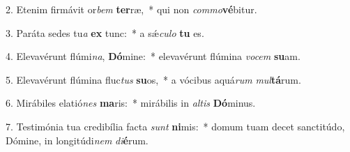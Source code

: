 2. Etenim firmávit or\textit{bem} \textbf{ter}ræ,~*  qui non \textit{com}\textit{mo}\textbf{vé}bitur.\

3. Paráta sedes tu\textit{a} \textbf{ex} tunc:~*  a sǽ\textit{cu}\textit{lo} \textbf{tu} es.\

4. Elevavérunt flúmi\textit{na}, \textbf{Dó}mine:~*  elevavérunt flúmina \textit{vo}\textit{cem} \textbf{su}am.\

5. Elevavérunt flúmina fluc\textit{tus} \textbf{su}os,~*  a vócibus aquá\textit{rum} \textit{mul}\textbf{tá}rum.\

6. Mirábiles elatió\textit{nes} \textbf{ma}ris:~*  mirábilis in \textit{al}\textit{tis} \textbf{Dó}minus.\

7. Testimónia tua credibília facta \textit{sunt} \textbf{ni}mis:~*  domum tuam decet sanctitúdo, Dómine, in longitúdi\textit{nem} \textit{di}\textbf{é}rum.\

